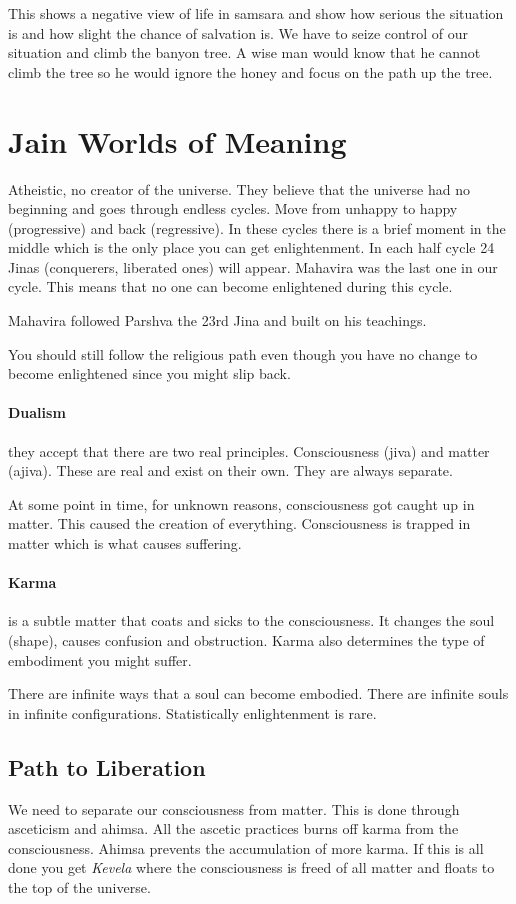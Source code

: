 \documentclass{article}
\begin{document}
This shows a negative view of life in samsara and show how serious the situation is and how slight the chance of salvation is. We have to seize control of our situation and climb the banyon tree. A wise man would know that he cannot climb the tree so he would ignore the honey and focus on the path up the tree.

\section*{Jain Worlds of Meaning}
\label{sec:jain_worlds_of_meaning}
Atheistic, no creator of the universe. They believe that the universe had no beginning and goes through endless cycles. Move from unhappy to happy (progressive) and back (regressive). In these cycles there is a brief moment in the middle which is the only place you can get enlightenment. In each half cycle 24 Jinas (conquerers, liberated ones) will appear. Mahavira was the last one in our cycle. This means that no one can become enlightened during this cycle.

Mahavira followed Parshva the 23rd Jina and built on his teachings.

You should still follow the religious path even though you have no change to become enlightened since you might slip back.

\paragraph{Dualism}
\label{par:dualism}
they accept that there are two real principles. Consciousness (jiva) and matter (ajiva). These are real and exist on their own. They are always separate.

At some point in time, for unknown reasons, consciousness got caught up in matter. This caused the creation of everything. Consciousness is trapped in matter which is what causes suffering.

\paragraph{Karma}
\label{par:karma}
is a subtle matter that coats and sicks to the consciousness. It changes the soul (shape), causes confusion and obstruction. Karma also determines the type of embodiment you might suffer.

There are infinite ways that a soul can become embodied. There are infinite souls in infinite configurations. Statistically enlightenment is rare.

\subsection*{Path to Liberation}
\label{sec:path_to_liberation}
We need to separate our consciousness from matter. This is done through asceticism and ahimsa. All the ascetic practices burns off karma from the consciousness. Ahimsa prevents the accumulation of more karma. If this is all done you get \emph{Kevela} where the consciousness is freed of all matter and floats to the top of the universe.
\end{document}
